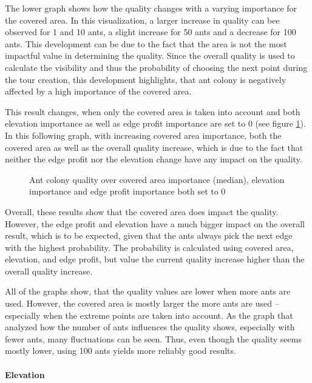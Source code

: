 The lower graph shows how the quality changes with a varying importance for the covered area.
In this visualization, a larger increase in quality can bee observed for 1 and 10 ants, a slight increase for 50 ants and a decrease for 100 ants.
This development can be due to the fact that the area is not the most impactful value in determining the quality.
Since the overall quality is used to calculate the visibility and thus the probability of choosing the next point during the tour creation, this development highlights, that ant colony is negatively affected by a high importance of the covered area.


This result changes, when only the covered area is taken into account and both elevation importance as well as edge profit importance are set to 0 (see figure \ref{fig:AntColonyAreaOnlyQualityMed}).
In this following graph, with increasing covered area importance, both the covered area as well as the overall quality increase, which is due to the fact that neither the edge profit nor the elevation change have any impact on the quality.


\begin{figure}[H]
	\centering
	
	\caption{Ant colony quality over covered area importance (median), elevation importance and edge profit importance both set to 0}
	\label{fig:AntColonyAreaOnlyQualityMed}
\end{figure}

Overall, these results show that the covered area does impact the quality.
However, the edge profit and elevation have a much bigger impact on the overall result, which is to be expected, given that the ants always pick the next edge with the highest probability.
The probability is calculated using covered area, elevation, and edge profit, but value the current quality increase higher than the overall quality increase.

All of the graphs show, that the quality values are lower when more ants are used.
However, the covered area is mostly larger the more ants are used -- especially when the extreme points are taken into account.
As the graph that analyzed how the number of ants influences the quality shows, especially with fewer ants, many fluctuations can be seen.
Thus, even though the quality seems mostly lower, using 100 ants yields more reliably good results.

\paragraph{Elevation}


